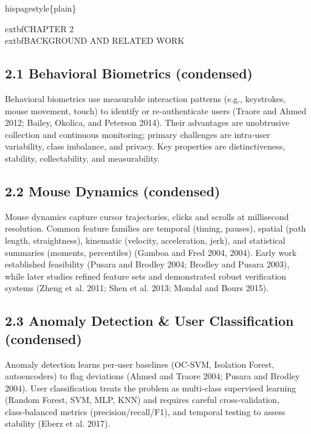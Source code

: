 \documentclass[
  11pt,
  a4paper,
]{article}
\begin{document}
hispagestyle\{plain\}

\begin{center}
\vspace*{2cm}
    extbf{\Large CHAPTER 2}\\[0.5cm]
    extbf{\Large BACKGROUND AND RELATED WORK}
\end{center}

\newpage

\subsection{2.1 Behavioral Biometrics
(condensed)}\label{behavioral-biometrics-condensed}

Behavioral biometrics use measurable interaction patterns (e.g.,
keystrokes, mouse movement, touch) to identify or re‑authenticate users
(Traore and Ahmed 2012; Bailey, Okolica, and Peterson 2014). Their
advantages are unobtrusive collection and continuous monitoring; primary
challenges are intra‑user variability, class imbalance, and privacy. Key
properties are distinctiveness, stability, collectability, and
measurability.

\subsection{2.2 Mouse Dynamics
(condensed)}\label{mouse-dynamics-condensed}

Mouse dynamics capture cursor trajectories, clicks and scrolls at
millisecond resolution. Common feature families are temporal (timing,
pauses), spatial (path length, straightness), kinematic (velocity,
acceleration, jerk), and statistical summaries (moments, percentiles)
(Gamboa and Fred 2004, 2004). Early work established feasibility (Pusara
and Brodley 2004; Brodley and Pusara 2003), while later studies refined
feature sets and demonstrated robust verification systems (Zheng et al.
2011; Shen et al. 2013; Mondal and Bours 2015).

\subsection{2.3 Anomaly Detection \& User Classification
(condensed)}\label{anomaly-detection-user-classification-condensed}

Anomaly detection learns per‑user baselines (OC‑SVM, Isolation Forest,
autoencoders) to flag deviations (Ahmed and Traore 2004; Pusara and
Brodley 2004). User classification treats the problem as multi‑class
supervised learning (Random Forest, SVM, MLP, KNN) and requires careful
cross‑validation, class‑balanced metrics (precision/recall/F1), and
temporal testing to assess stability (Eberz et al. 2017).
\end{document}
